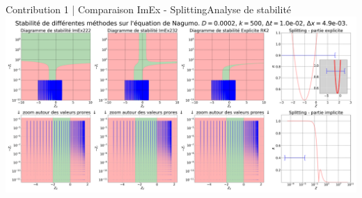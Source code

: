 \begin{frame}{Contribution 1 | Comparaison ImEx - Splitting}{Analyse de stabilité}
    \includegraphics[width = \textwidth]{medias/2_/1_/STABILITE_D0.0002_k500_dt1.0e-02_dx4.9e-03.png}
\end{frame}